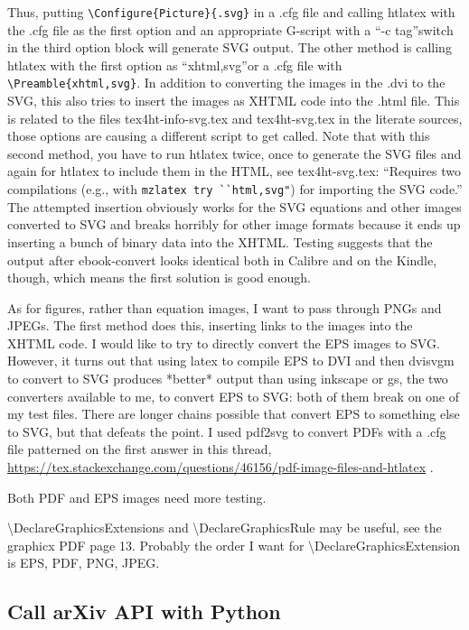 \documentclass[12pt]{article}
\begin{document}
Thus, putting \verb+\Configure{Picture}{.svg}+ in a .cfg file and calling
htlatex with the .cfg file as the first option and an appropriate
G-script with a ``-c tag''switch in the third option block will
generate SVG output.  The other method is calling htlatex with the
first option as ``xhtml,svg''or a .cfg file with
\verb+\Preamble{xhtml,svg}+.  In addition to converting the images in the
.dvi to the SVG, this also tries to insert the images as XHTML code
into the .html file.  This is related to the files tex4ht-info-svg.tex
and tex4ht-svg.tex in the literate sources, those options are causing
a different script to get called.  Note that with this second method,
you have to run htlatex twice, once to generate the SVG files and
again for htlatex to include them in the HTML, see tex4ht-svg.tex:
``Requires two compilations (e.g., with \verb!mzlatex try ``html,svg"!)
for importing the SVG code.'' The attempted insertion obviously works
for the SVG equations and other images converted to SVG and breaks
horribly for other image formats because it ends up inserting a bunch
of binary data into the XHTML.  Testing suggests that the output after
ebook-convert looks identical both in Calibre and on the Kindle,
though, which means the first solution is good enough.

As for figures, rather than equation images, I want to pass through
PNGs and JPEGs.  The first method does this, inserting links to the
images into the XHTML code.  I would like to try to directly convert
the EPS images to SVG.  However, it turns out that using latex to
compile EPS to DVI and then dvisvgm to convert to SVG produces
*better* output than using inkscape or gs, the two converters
available to me, to convert EPS to SVG: both of them break on one of
my test files.  There are longer chains possible that convert EPS to
something else to SVG, but that defeats the point.  I used pdf2svg to
convert PDFs with a .cfg file patterned on the first answer in this
thread,
\url{https://tex.stackexchange.com/questions/46156/pdf-image-files-and-htlatex}
.

Both PDF and EPS images need more testing.

\textbackslash DeclareGraphicsExtensions and \textbackslash DeclareGraphicsRule may be useful, see
the graphicx PDF page 13.  Probably the order I want for
\textbackslash DeclareGraphicsExtension is EPS, PDF, PNG, JPEG.


\subsection{Call arXiv API with Python}
\label{sec:call_arxiv_api}
\end{document}
